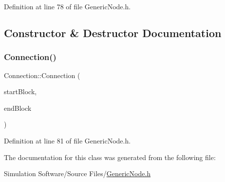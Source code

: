 Definition at line 78 of file Generic\+Node.\+h.



\subsection{Constructor \& Destructor Documentation}
\mbox{\label{class_connection_a9f0ec6c9f46d973813357248e2600695}} 
\subsubsection{\texorpdfstring{Connection()}{Connection()}}
{\footnotesize\ttfamily Connection\+::\+Connection (\begin{DoxyParamCaption}\item[{\hyperlink{class_generic_node}{Generic\+Node} $\ast$}]{start\+Block,  }\item[{\hyperlink{class_generic_node}{Generic\+Node} $\ast$}]{end\+Block }\end{DoxyParamCaption})\hspace{0.3cm}{\ttfamily [inline]}}



Definition at line 81 of file Generic\+Node.\+h.



The documentation for this class was generated from the following file\+:\begin{DoxyCompactItemize}
\item 
Simulation Software/\+Source Files/\hyperlink{_generic_node_8h}{Generic\+Node.\+h}\end{DoxyCompactItemize}
